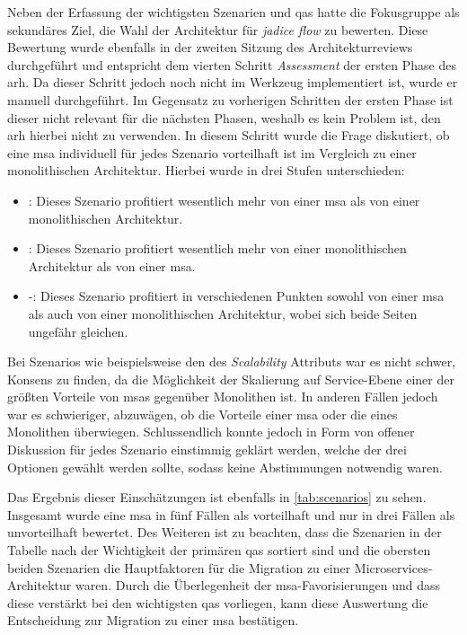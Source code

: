 Neben der Erfassung der wichtigsten Szenarien und \glspl{qa} hatte die Fokusgruppe als sekundäres Ziel, die Wahl der Architektur für \emph{jadice flow} zu bewerten. 
Diese Bewertung wurde ebenfalls in der zweiten Sitzung des Architekturreviews durchgeführt und entspricht dem vierten Schritt \emph{Assessment} der ersten Phase des \gls{arh}.
Da dieser Schritt jedoch noch nicht im Werkzeug implementiert ist, wurde er manuell durchgeführt.
Im Gegensatz zu vorherigen Schritten der ersten Phase ist dieser nicht relevant für die nächsten Phasen, weshalb es kein Problem ist, den \gls{arh} hierbei nicht zu verwenden.
In diesem Schritt wurde die Frage diskutiert, ob eine \acrlong{msa} individuell für jedes Szenario vorteilhaft ist im Vergleich zu einer monolithischen Architektur.
Hierbei wurde in drei Stufen unterschieden:
\begin{itemize}
	\item \advantage\hspace*{0.1cm}: Dieses Szenario profitiert wesentlich mehr von einer \gls{msa} als von einer monolithischen Architektur.
	\item \disadvantage\hspace*{0.1cm}: Dieses Szenario profitiert wesentlich mehr von einer monolithischen Architektur als von einer \gls{msa}.
	\item \hspace*{0.27cm}-\hspace*{0.27cm}: Dieses Szenario profitiert in verschiedenen Punkten sowohl von einer \gls{msa} als auch von einer monolithischen Architektur, wobei sich beide Seiten ungefähr gleichen.
\end{itemize}
Bei Szenarios wie beispielsweise den des \emph{Scalability} Attributs war es nicht schwer, Konsens zu finden, da die Möglichkeit der Skalierung auf Service-Ebene einer der größten Vorteile von \glspl{msa} gegenüber Monolithen ist.
In anderen Fällen jedoch war es schwieriger, abzuwägen, ob die Vorteile einer \gls{msa} oder die eines Monolithen überwiegen.
Schlussendlich konnte jedoch in Form von offener  Diskussion für jedes Szenario einstimmig geklärt werden, welche der drei Optionen gewählt werden sollte, sodass keine Abstimmungen notwendig waren.

Das Ergebnis dieser Einschätzungen ist ebenfalls in \cref{tab:scenarios} zu sehen.
Insgesamt wurde eine \gls{msa} in fünf Fällen als vorteilhaft und nur in drei Fällen als unvorteilhaft bewertet. 
Des Weiteren ist zu beachten, dass die Szenarien in der Tabelle nach der Wichtigkeit der primären \glspl{qa} sortiert sind und die obersten beiden Szenarien die Hauptfaktoren für die Migration zu einer Microservices-Architektur waren.
Durch die Überlegenheit der \gls{msa}-Favorisierungen und dass diese verstärkt bei den wichtigsten \glspl{qa} vorliegen, kann diese Auswertung die Entscheidung zur Migration zu einer \gls{msa} bestätigen.

